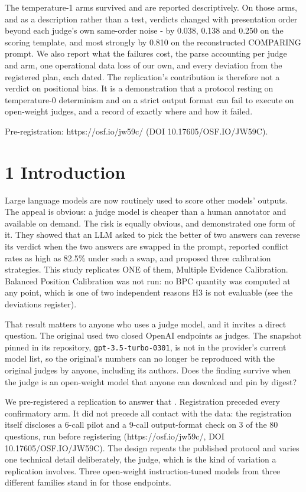The temperature-1 arms survived and are reported descriptively. On those arms, and as a description
rather than a test, verdicts changed with presentation order beyond each judge's own same-order
noise - by 0.038, 0.138 and 0.250 on the scoring template, and most strongly by 0.810 on the
reconstructed COMPARING prompt. We also report what the failures
cost, the parse accounting per judge and arm, one operational data loss of our own, and every
deviation from the registered plan, each dated. The replication's contribution is therefore not a
verdict on positional bias. It is a demonstration that a protocol resting on temperature-0
determinism and on a strict output format can fail to execute on open-weight judges, and a record
of exactly where and how it failed.

Pre-registration: https://osf.io/jw59c/ (DOI 10.17605/OSF.IO/JW59C).

\section{1 Introduction}\label{introduction}

Large language models are now routinely used to score other models' outputs. The appeal is obvious:
a judge model is cheaper than a human annotator and available on demand. The risk is equally
obvious, and \textcite{wang2024} demonstrated one form of it. They showed that an LLM asked to pick
the better of two answers can reverse its verdict when the two answers are swapped in the prompt,
reported conflict rates as high as 82.5\% under such a swap, and proposed three calibration strategies. This study replicates
ONE of them, Multiple Evidence Calibration. Balanced Position Calibration was not run: no BPC
quantity was computed at any point, which is one of two independent reasons H3 is not evaluable
(see the deviations register).

That result matters to anyone who uses a judge model, and it invites a direct question. The original
used two closed OpenAI endpoints as judges. The snapshot pinned in its repository,
\texttt{gpt-3.5-turbo-0301}, is not in the provider's current model list, so the original's numbers can no longer be reproduced
with the original judges by anyone, including its authors. Does the finding survive when the judge
is an open-weight model that anyone can download and pin by digest?

We pre-registered a replication to answer that \autocite{prereg}. Registration preceded every confirmatory arm. It
did not precede all contact with the data: the registration itself discloses a 6-call pilot and a
9-call output-format check on 3 of the 80 questions, run before registering
(https://osf.io/jw59c/, DOI 10.17605/OSF.IO/JW59C). The design repeats the published protocol and
varies one technical detail deliberately, the judge, which is the kind of variation a replication involves. Three open-weight instruction-tuned models from three
different families stand in for those endpoints.

